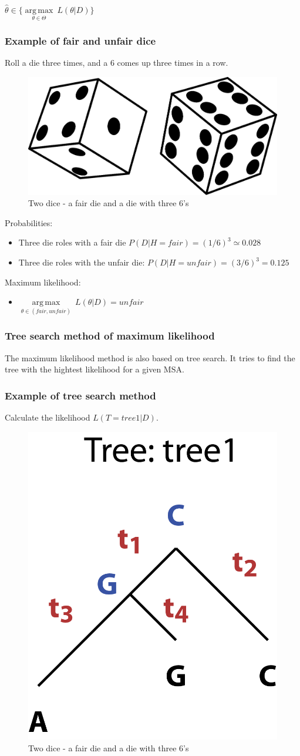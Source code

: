 ${\displaystyle {\hat {\theta }}\in \{{\underset {\theta \in \Theta }{\operatorname {arg\,max} }}\ L(\theta|D)\}}$

%
%
\subsubsection*{Example of fair and unfair dice}
Roll a die three times, and a 6 comes up three times in a row.

\begin{figure}[H]
  \centering
      \includegraphics[width=0.3 \textwidth]{fig09/dice_unfair.png}
        \caption{Two dice - a fair die and a die with three 6’s}
\end{figure}

\noindent
Probabilities:
\begin{itemize}
\item Three die roles with a fair die $P(D|H = fair) = (1/6)^3 \simeq 0.028$
\item Three die roles with the unfair die: $P(D|H = unfair) =(3/6)^3 = 0.125$
\end{itemize}

\noindent
Maximum likelihood:
\begin{itemize}
\item ${\displaystyle {\underset {\theta \in (fair, unfair) }{\operatorname {arg\,max} }}\ L(\theta|D)} = unfair$
\end{itemize}

%
%
\subsubsection*{Tree search method of maximum likelihood}
The maximum likelihood method is also based on tree search. It tries to find the tree with the hightest likelihood for a given MSA.

%
%
\subsubsection*{Example of tree search method }
Calculate the likelihood $L(T=tree1|D )$.
 
 \begin{figure}[H]
  \centering
      \includegraphics[width=0.2 \textwidth]{fig09/ml_tree.png}
      \caption{Two dice - a fair die and a die with three 6’s}
\end{figure}
 
